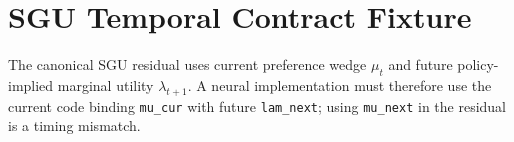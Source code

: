 \section{SGU Temporal Contract Fixture}
\label{sec:sgu_marginal_utility_timing_fixture}

The canonical SGU residual uses current preference wedge \(\mu_t\) and future
policy-implied marginal utility \(\lambda_{t+1}\). A neural implementation must
therefore use the current code binding \texttt{mu_cur} with future
\texttt{lam_next}; using \texttt{mu_next} in the residual is a timing mismatch.
